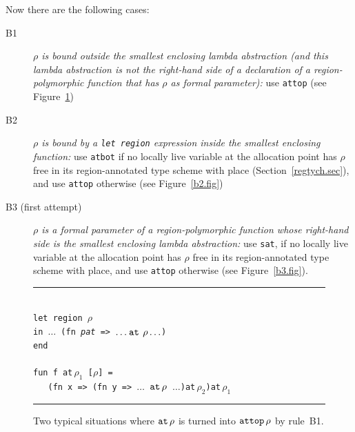 \documentclass[12pt]{book}
\begin{document}
Now there are the following cases:
\begin{description}
\item[B1] {\it $\rho$ is bound outside the smallest enclosing lambda
    abstraction (and this lambda abstraction is not the right-hand
    side of a declaration of a region-polymorphic function that has
    $\rho$ as formal parameter):} use {\tt attop}
    (see Figure~\ref{b1.fig})
  \item[B2] {\it $\rho$ is bound by a {\tt let region} expression
      inside the smallest enclosing function:} use {\tt atbot} if no
    locally live variable at the allocation point has $\rho$ free in
    its region-annotated type scheme with place
    (Section~\ref{regtych.sec}), and use {\tt attop} otherwise
    (see Figure~\ref{b2.fig})
  \item[B3 (first attempt)]{\it $\rho$ is a formal parameter of a
      region-polymorphic function whose right-hand side is the
      smallest enclosing lambda abstraction:} use
    {\tt sat}, if no locally live variable at the allocation point has
    $\rho$ free in its region-annotated type scheme with place, and
    use {\tt attop} otherwise (see Figure~\ref{b3.fig}).
\end{description}
\begin{figure}[htb]
\hrule
\begin{center}
\begin{tabbing}
\\
\hskip3cm\=\tt let region $\rho$\\
       \>\tt in $\ldots$ (fn {\it pat} => $\ldots\mathbin{\hbox{\tt at}}\,\rho\ldots$)\\
       \>\tt end\\
\\
       \>\tt fun f at$\,\rho_1$ [$\rho$] =\\
       \>\tt\ \ \ (fn x => (fn y => $\ldots$ $\mathbin{\hbox{\tt at}}\,\rho$ $\ldots$)at$\,\rho_2$)at$\,\rho_1$\\
\end{tabbing}
\end{center}
\caption{Two typical situations where $\mathbin{\hbox{\tt at}}\,\rho$ is turned into $\hbox{\tt attop}\,\rho$
  by
  rule~B1.} \medskip \hrule
\label{b1.fig}
\end{figure}
\end{document}
